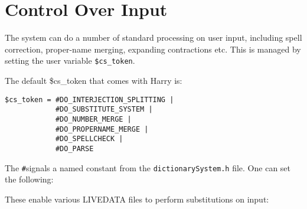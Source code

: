 \documentclass[]{article}
\begin{document}
\section{Control Over Input}\label{control-over-input}

The system can do a number of standard processing on user input,
including spell correction, proper-name merging, expanding contractions
etc. This is managed by setting the user variable \texttt{\$cs\_token}.

The default \$cs\_token that comes with Harry is:

\begin{verbatim}
$cs_token = #DO_INTERJECTION_SPLITTING | 
            #DO_SUBSTITUTE_SYSTEM |
            #DO_NUMBER_MERGE | 
            #DO_PROPERNAME_MERGE | 
            #DO_SPELLCHECK |
            #DO_PARSE
\end{verbatim}

The \texttt{\#}signals a named constant from the
\texttt{dictionarySystem.h} file. One can set the following:

These enable various LIVEDATA files to perform substitutions on input:
\end{document}
